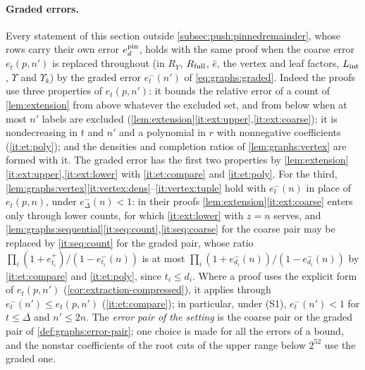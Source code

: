 \paragraph{Graded errors.}
Every statement of this section outside \cref{subsec:push:pinnedremainder}, whose
rows carry their own error $e^{\rm pin}_d$, holds with the same proof when the
coarse error $e_t(p,n')$ is replaced throughout (in $R_Y$, $R_{\rm full}$, $\hat e$,
the vertex and leaf factors, $L_{\rm int}$, $\Upsilon$ and $\Upsilon_k$) by the graded
error $e^-_t(n')$ of \eqref{eq:graphs:graded}. Indeed the proofs use three
properties of $e_t(p,n')$: it bounds the relative error of a count of
\cref{lem:extension} from above whatever the excluded set, and from below when at
most $n'$ labels are excluded
(\cref{lem:extension}\ref{it:ext:upper},\ref{it:ext:coarse}); it is nondecreasing in
$t$ and $n'$ and a polynomial in $r$ with nonnegative coefficients
(\ref{it:et:poly}); and the densities and completion ratios of
\cref{lem:graphs:vertex} are formed with it. The graded error has the first two
properties by \cref{lem:extension}\ref{it:ext:upper},\ref{it:ext:lower} with
\ref{it:et:compare} and \ref{it:et:poly}. For the third,
\cref{lem:graphs:vertex}\ref{it:vertex:dens}--\ref{it:vertex:tuple} hold with
$e^-_t(n)$ in place of $e_t(p,n)$, under $e^-_\Delta(n)<1$: in their proofs
\cref{lem:extension}\ref{it:ext:coarse} enters only through lower counts, for which
\ref{it:ext:lower} with $z=n$ serves, and
\cref{lem:graphs:sequential}\ref{it:seq:count},\ref{it:seq:coarse} for the coarse pair
may be replaced by \ref{it:seq:count} for the graded pair, whose ratio
$\prod_i(1+e^+_{t_i})/(1-e^-_{t_i}(n))$ is at most
$\prod_i(1+e^-_{d_i}(n))/(1-e^-_{d_i}(n))$ by \ref{it:et:compare} and
\ref{it:et:poly}, since $t_i\le d_i$. Where a proof uses the explicit form of
$e_t(p,n')$ (\cref{cor:extraction-compressed}), it applies through
$e^-_t(n')\le e_t(p,n')$ (\ref{it:et:compare}); in particular, under (S1),
$e^-_t(n')<1$ for $t\le\Delta$ and $n'\le2n$. The \emph{error pair of the setting}
is the coarse pair or the graded pair of \cref{def:graphs:error-pair}; one choice
is made for all the errors of a bound, and the nonstar coefficients of the root cuts
of the upper range below $2^{52}$ use the graded one.

